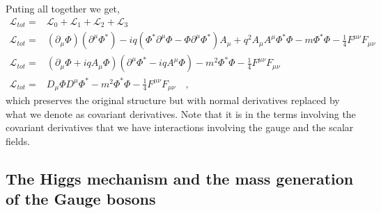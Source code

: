 Puting all together we get,
%
 \begin{align} 
  \mathcal{L}_{tot}= & \mathcal{L}_0+\mathcal{L}_1+\mathcal{L}_2+\mathcal{L}_3 \nonumber \\
  \mathcal{L}_{tot}= & (\partial_\mu \Phi)(\partial^\mu \Phi^*) - iq(\Phi^* \partial^\mu \Phi - \Phi \partial^\mu \Phi^* )A_\mu + q^2 A_\mu A^\mu \Phi^* \Phi - m \Phi^* \Phi - \frac{1}{4} F^{\mu \nu} F_{\mu \nu} \nonumber \\ 
  \mathcal{L}_{tot}= & (\partial_\mu \Phi + iq A_\mu \Phi)(\partial^\mu \Phi^* - iq A^\mu \Phi)- m^2 \Phi^* \Phi  - \frac{1}{4} F^{\mu \nu} F_{\mu \nu} \nonumber \\
  \mathcal{L}_{tot}= & D_\mu \Phi D^\mu \Phi^*  - m^2 \Phi^* \Phi  - \frac{1}{4} F^{\mu \nu} F_{\mu \nu} \quad ,  \label{totgarbage}
 \end{align}
%
which preserves the original structure but with normal derivatives replaced by what we denote as covariant derivatives. Note that it is in the terms involving the covariant derivatives that we have interactions involving the gauge and the scalar fields.
 



\subsection{The Higgs mechanism and the mass generation of the Gauge bosons}



